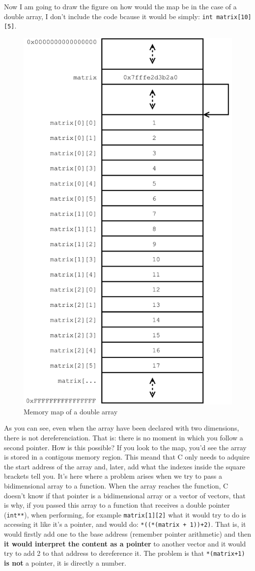\documentclass[a4paper]{article}
\begin{document}
Now I am going to draw the figure on how would the map be in the case of a
double array, I don't include the code bcause it would be simply:
\lstinline[style=C]!int matrix[10][5]!.

\begin{figure}[H]
    \center
    \includegraphics[width=.5\linewidth]{double_array_map}
    \caption{Memory map of a double array}
    \label{img:double_array_map}
\end{figure}

As you can see, even when the array have been declared with two dimensions,
there is not dereferenciation. That is: there is no moment in which you follow a
second pointer. How is this possible? If you look to the map, you'd see the
array is stored in a contigous memory region. This meand that C only needs to
adquire the start address of the array and, later, add what the indexes
inside the square brackets tell you. It's here where a problem arises when we
try to pass a bidimensional array to a function. When the array reaches the
function, C doesn't know if that pointer is a bidimensional array or a vector
of vectors, that is why, if you passed this array to a function that receives a
double pointer (\verb!int**!), when performing, for example \verb!matrix[1][2]!
what it would try to do is accessing it like it's a pointer, and would do:
\verb!*((*(matrix + 1))+2)!. That is, it would firstly add one to the base
address (remember pointer arithmetic) and then \textbf{it would interpret the
content as a pointer} to another vector and it would try to add 2 to that
address to dereference it. The problem is that \verb!*(matrix+1)!
\textbf{is not} a pointer, it is directly a number.
\end{document}

